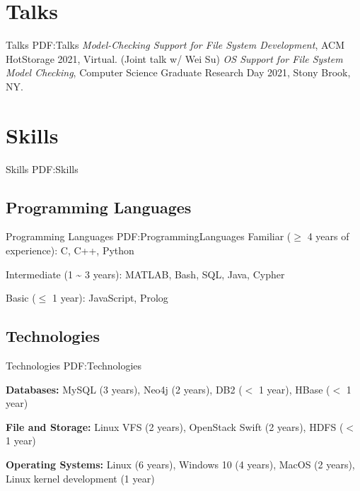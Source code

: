 \documentclass[letterpaper,10pt,oneside]{article}
\begin{document}
\begin{body}
\section
{Talks}
{Talks}
{PDF:Talks}
\BulletItem
\emph{Model-Checking Support for File System Development}, ACM HotStorage 2021, Virtual. (Joint talk w/ Wei Su)
\GapNoBreak
\BulletItem
\emph{OS Support for File System Model Checking}, 
Computer Science Graduate Research Day 2021, Stony Brook, NY.
\GapNoBreak



\section
{Skills}
{Skills}
{PDF:Skills}


\subsection
{Programming Languages}
{Programming Languages}
{PDF:ProgrammingLanguages}
\GapNoBreak
\BulletItem
Familiar ($\geq$ 4 years of experience): C, C++, Python

\GapNoBreak
\BulletItem
Intermediate (1 {\textasciitilde} 3 years): MATLAB, Bash, SQL, Java, Cypher

\GapNoBreak
\BulletItem
Basic ($\leq$ 1 year): JavaScript, Prolog
\BigGap
\GapNoBreak
\subsection
{Technologies}
{Technologies}
{PDF:Technologies}

\GapNoBreak
\BulletItem
\textbf{Databases:} MySQL (3 years), Neo4j (2 years), DB2 ($<$ 1 year), HBase ($<$ 1 year)

\GapNoBreak
\BulletItem
\textbf{File and Storage:} Linux VFS (2 years), OpenStack Swift (2 years), HDFS ($<$ 1 year)



\GapNoBreak
\BulletItem
\textbf{Operating Systems:} Linux (6 years), Windows 10 (4 years), MacOS (2 years), Linux kernel development (1 year)



\end{body}
\end{document}
